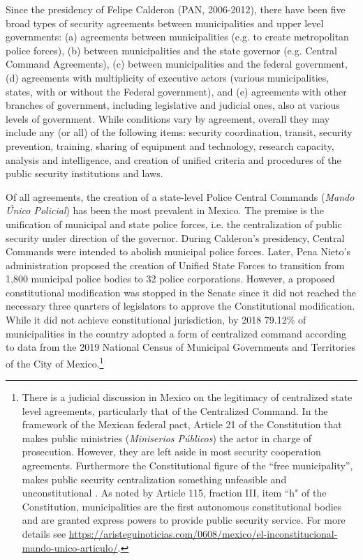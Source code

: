 \documentclass[12pt]{amsart}
\numberwithin{equation}{section}
\theoremstyle{definition}
\theoremstyle{definition}
\theoremstyle{definition}
\begin{document}
\begin{appendix}
Since the presidency of Felipe Calderon (PAN, 2006-2012), there have been five broad types of security agreements between municipalities and upper level governments: (a) agreements between municipalities (e.g. to create metropolitan police forces), (b) between municipalities and the state governor (e.g. Central Command Agreements), (c) between municipalities and the federal government, (d) agreements with multiplicity of executive actors (various municipalities, states, with or without the Federal government), and (e) agreements with other branches of government, including legislative and judicial ones, also at various levels of government. While conditions vary by agreement, overall they may include any (or all) of the following items: security coordination, transit, security prevention, training, sharing of equipment and technology, research capacity, analysis and intelligence, and creation of unified criteria and procedures of the public security institutions and laws. 

Of all agreements, the creation of a state-level Police Central Commands (\emph{Mando \'Unico Policial}) has been the most prevalent in Mexico. The premise is the unification of municipal and state police forces, i.e. the centralization of public security under direction of the governor. During Calderon's presidency, Central Commands were intended to abolish municipal police forces. Later, Pena Nieto's administration proposed the creation of Unified State Forces to transition from 1,800 municipal police bodies to 32 police corporations. However, a proposed constitutional modification was stopped in the Senate since it did not reached the necessary three quarters of legislators to approve the Constitutional modification. While it did not achieve constitutional jurisdiction, by 2018 79.12\% of municipalities in the country adopted a form of centralized command according to data from the 2019 National Census of Municipal Governments and Territories of the City of Mexico.\footnote{There is a judicial discussion in Mexico on the legitimacy of centralized state level agreements, particularly that of the Centralized Command. In the framework of the Mexican federal pact, Article 21 of the Constitution that makes public ministries (\emph{Miniserios P\'ublicos}) the actor in charge of prosecution. However, they are  left aside in most security cooperation agreements. Furthermore the Constitutional figure of the ``free municipality'', makes public security centralization something unfeasible and unconstitutional \citep{moloeznik_2016}. As noted by Article 115, fraction III, item ``h" of the Constitution, municipalities are the first autonomous constitutional bodies and are granted express powers to provide public security service. For more details see \url{https://aristeguinoticias.com/0608/mexico/el-inconstitucional-mando-unico-articulo/}.}  


\end{appendix}
\end{document}
